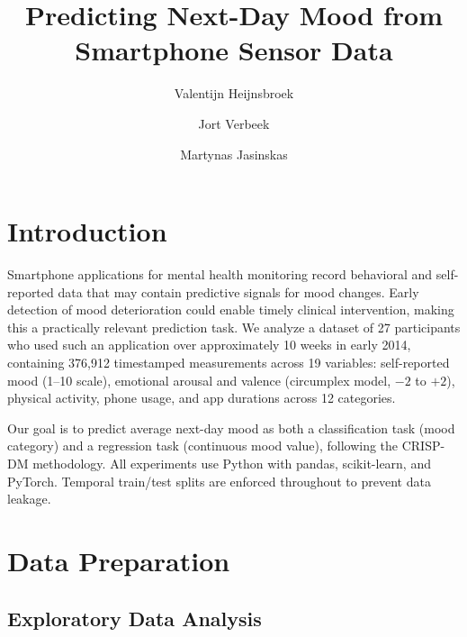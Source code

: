 \documentclass[runningheads]{llncs}
\begin{document}
\title{Predicting Next-Day Mood from Smartphone Sensor Data}

\author{Valentijn Heijnsbroek \and Jort Verbeek \and Martynas Jasinskas}

\maketitle

\section{Introduction}

Smartphone applications for mental health monitoring record behavioral and self-reported data that may contain predictive signals for mood changes. Early detection of mood deterioration could enable timely clinical intervention, making this a practically relevant prediction task. We analyze a dataset of 27 participants who used such an application over approximately 10 weeks in early 2014, containing 376,912 timestamped measurements across 19 variables: self-reported mood (1--10 scale), emotional arousal and valence (circumplex model, $-2$ to $+2$), physical activity, phone usage, and app durations across 12 categories.

Our goal is to predict average next-day mood as both a classification task (mood category) and a regression task (continuous mood value), following the CRISP-DM methodology. All experiments use Python with pandas, scikit-learn, and PyTorch. Temporal train/test splits are enforced throughout to prevent data leakage.

\section{Data Preparation}

\subsection{Exploratory Data Analysis}
\end{document}
